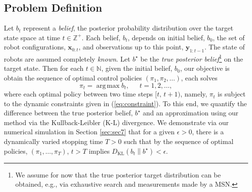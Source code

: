 \documentclass[letterpaper, 10 pt, conference]{ieeeconf}
\DeclareMathOperator*{\argmax}{arg\,max}
\newcommand{\Ram}[1]{{\normalsize{\textbf{({\color{green}Ram:\ }#1)}}}}
\begin{document}

\subsection{Problem Definition}
Let $b_t$ represent a \emph{belief}, the posterior probability distribution over the target state space at time $t \in \mathbb{Z}^{+}$.
Each belief, $b_t$, depends on initial belief, $b_0$, the set of robot configurations, $\bm{x}_{0:t}$, and observations up to this point, $\bm{y}_{1:t-1}$.
The state of robots are assumed completely \emph{known}.
Let $b^{\star}$ be the \emph{true posterior belief}\footnote{We assume for now that the true posterior target distribution can be obtained, e.g., via exhaustive search and measurements made by a MSN.} on the target state. 
Then for each $t \in \mathbb{N}$, given the initial belief, $b_0$, our objective is obtain the sequence of optimal control policies $(\pi_1,\pi_2,\dots)$, each solves
\begin{equation}
\pi_{t} = \argmax b_t,\,\,\,\,\,\,\,\,\,t = 1,2,\dots,
\end{equation}
where each optimal policy between two time steps $[t,\,t+1)$, namely, $\pi_t$ is subject to the dynamic constraints given in (\ref{eq:constraint}). 
To this end, we quantify the difference between the true posterior belief, $b^{\star}$ and an approximation using our method via the Kullback-Leibler (K-L) divergence.
We demonstrate via our numerical simulation in Section \ref{sec:sec7} that for a given $\epsilon>0$, there is a dynamically varied stopping time $T >0$ such that  by the sequence of optimal policies, $(\pi_1,\dots,\pi_T)$, $t > T$ implies  $D_{\text{KL}}\left(b_{t} \middle\| b^{\star}\right) < \epsilon$.

\end{document}
